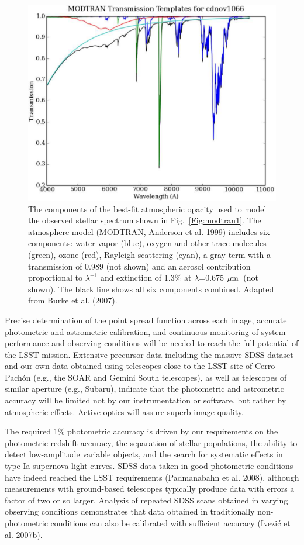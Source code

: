 \documentclass{emulateapj}
\def\mic              {\hbox{$\mu{\rm m}$}}
\begin{document}
\begin{figure}
\includegraphics[width=1.0\hsize,clip]{modtran2.pdf}
\caption{The components of the best-fit atmospheric opacity used to
model the observed stellar spectrum shown in Fig.~\ref{Fig:modtran1}.
The atmosphere model (MODTRAN, Anderson et al. 1999) includes six
components: water vapor (blue), oxygen and other trace molecules
(green), ozone (red), Rayleigh scattering (cyan), a gray term
with a transmission of 0.989 (not shown) and an aerosol contribution
proportional to $\lambda^{-1}$ and extinction of 1.3\% at $\lambda$=0.675 \mic\
(not shown). The black line shows all six components combined.
Adapted from Burke et al. (2007).}
\label{Fig:modtran2}
\end{figure}


Precise determination of the point spread function across each image, 
accurate photometric and astrometric calibration, and continuous monitoring 
of system performance and observing conditions will be needed to reach the 
full potential of the LSST mission. Extensive precursor data including the 
massive SDSS dataset and our own data obtained using telescopes close to 
the LSST site of Cerro Pach\'{o}n (e.g., the SOAR and Gemini South telescopes), 
as well as telescopes of similar aperture (e.g., Subaru), indicate that the 
photometric and astrometric accuracy will be limited not by our instrumentation 
or software, but rather by atmospheric effects. Active optics will assure 
superb image quality. 

The required 1\% photometric accuracy is driven by our requirements 
on the photometric redshift accuracy, the separation of stellar populations, 
the ability to detect low-amplitude variable objects, and the search for 
systematic effects in type Ia supernova light curves. SDSS data 
taken in good photometric conditions have indeed reached the LSST requirements
(Padmanabahn et al. 2008), although measurements with ground-based telescopes 
typically produce data with errors a factor of two or so larger. Analysis of
repeated SDSS scans obtained in varying observing conditions demonstrates that data
obtained in traditionally non-photometric conditions can also be calibrated with
sufficient accuracy (Ivezi\'{c} et al. 2007b). 
\end{document}
